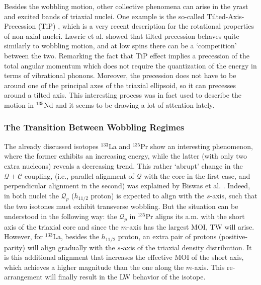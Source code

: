 Besides the wobbling motion, other collective phenomena can arise in the yrast and excited bands of triaxial nuclei. One example is the so-called Tilted-Axis-Precession (TiP) \cite{lawrie2020tilted}, which is a very recent description for the rotational properties of non-axial nuclei. Lawrie et al. showed that tilted precession behaves quite similarly to wobbling motion, and at low spins there can be a `competition' between the two. Remarking the fact that TiP effect implies a precession of the total angular momentum which does not require the quantization of the energy in terms of vibrational phonons. Moreover, the precession does not have to be around one of the principal axes of the triaxial ellipsoid, so it can precesses around a tilted axis. This interesting process was in fact used to describe the motion in $^{135}$Nd \cite{lv2021tilted} and it seems to be drawing a lot of attention lately.

\subsubsection*{The Transition Between Wobbling Regimes}

The already discussed isotopes $^{133}$La and $^{135}$Pr show an interesting phenomenon, where the former exhibits an increasing energy, while the latter (with only two extra nucleons) reveals a decreasing trend. This rather `abrupt' change in the $\mathcal{Q}+\mathscr{C}$ coupling, (i.e., parallel alignment of $\mathcal{Q}$ with the core in the first case, and perpendicular alignment in the second) was explained by Biswas et al. \cite{biswas2019longitudinal}. Indeed, in both nuclei the $\mathcal{Q}_p$ ($h_{11/2}$ proton) is expected to align with the $s$-axis, such that the two isotones must exhibit transverse wobbling. But the situation can be understood in the following way: the $\mathcal{Q}_p$ in $^{135}$Pr aligns its a.m. with the short axis of the triaxial core and since the $m$-axis has the largest MOI, TW will arise. However, for $^{133}$La, besides the $h_{11/2}$ proton, an extra pair of protons (positive-parity) will align gradually with the $s$-axis of the triaxial density distribution. It is this additional alignment that increases the effective MOI of the short axis, which achieves a higher magnitude than the one along the $m$-axis. This re-arrangement will finally result in the LW behavior of the isotope.

